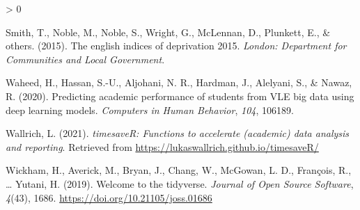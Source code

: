 \documentclass[
  english,
  man,mask,floatsintext]{apa6}
\newlength{\cslhangindent}
\newenvironment{CSLReferences}[2] %
 {%
  \setlength{\parindent}{0pt}
  \ifodd #1 \everypar{\setlength{\hangindent}{\cslhangindent}}\ignorespaces\fi
  \ifnum #2 > 0
  \setlength{\parskip}{#2\baselineskip}
  \fi
 }%
 {}
\begin{document}
\begin{CSLReferences}{1}{0}
\leavevmode\hypertarget{ref-smith2015english}{}%
Smith, T., Noble, M., Noble, S., Wright, G., McLennan, D., Plunkett, E., \& others. (2015). The english indices of deprivation 2015. \emph{London: Department for Communities and Local Government}.

\leavevmode\hypertarget{ref-waheed2020predicting}{}%
Waheed, H., Hassan, S.-U., Aljohani, N. R., Hardman, J., Alelyani, S., \& Nawaz, R. (2020). Predicting academic performance of students from VLE big data using deep learning models. \emph{Computers in Human Behavior}, \emph{104}, 106189.

\leavevmode\hypertarget{ref-R-timesaveR}{}%
Wallrich, L. (2021). \emph{timesaveR: Functions to accelerate (academic) data analysis and reporting}. Retrieved from \url{https://lukaswallrich.github.io/timesaveR/}

\leavevmode\hypertarget{ref-R-tidyverse}{}%
Wickham, H., Averick, M., Bryan, J., Chang, W., McGowan, L. D., François, R., \ldots{} Yutani, H. (2019). Welcome to the {tidyverse}. \emph{Journal of Open Source Software}, \emph{4}(43), 1686. \url{https://doi.org/10.21105/joss.01686}

\end{CSLReferences}

\endgroup
\end{document}
